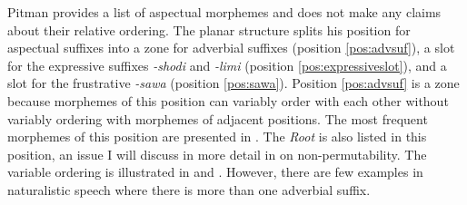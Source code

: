 \documentclass[output=paper,hidelinks]{langscibook}
\begin{document}

Pitman provides a list of aspectual morphemes and does not make any claims about their relative ordering. The planar structure splits his position for aspectual suffixes into a zone for adverbial suffixes (position \ref{pos:advsuf}), a slot for the expressive suffixes \textit{-shodi} and \textit{-limi} (position \ref{pos:expressiveslot}), and a slot for the frustrative \textit{-sawa} (position \ref{pos:sawa}). Position \ref{pos:advsuf} is a zone because morphemes of this position can variably order with each other without variably ordering with morphemes of adjacent positions. The most frequent morphemes of this position are presented in . The \textit{Root} is also listed in this position, an issue I will discuss in more detail in  on non-permutability. The variable ordering is illustrated in  and . However, there are few examples in naturalistic speech where there is more than one adverbial suffix.
\end{document}
